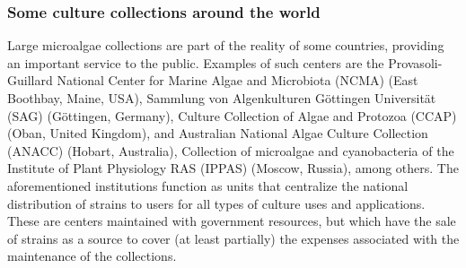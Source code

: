 \subsubsection{Some culture collections around the world}
Large microalgae collections are part of the reality of some countries, providing an important service to the public. Examples of such centers are the Provasoli-Guillard National Center for Marine Algae and Microbiota (NCMA) (East Boothbay, Maine, USA), Sammlung von Algenkulturen G\"{o}ttingen Universität (SAG) (G\"{o}ttingen, Germany), Culture Collection of Algae and Protozoa (CCAP) (Oban, United Kingdom), and Australian National Algae Culture Collection (ANACC) (Hobart, Australia), Collection of microalgae and cyanobacteria of the Institute of Plant Physiology RAS (IPPAS) (Moscow, Russia), among others. The aforementioned institutions function as units that centralize the national distribution of strains to users for all types of culture uses and applications. These are centers maintained with government resources, but which have the sale of strains as a source to cover (at least partially) the expenses associated with the maintenance of the collections.
